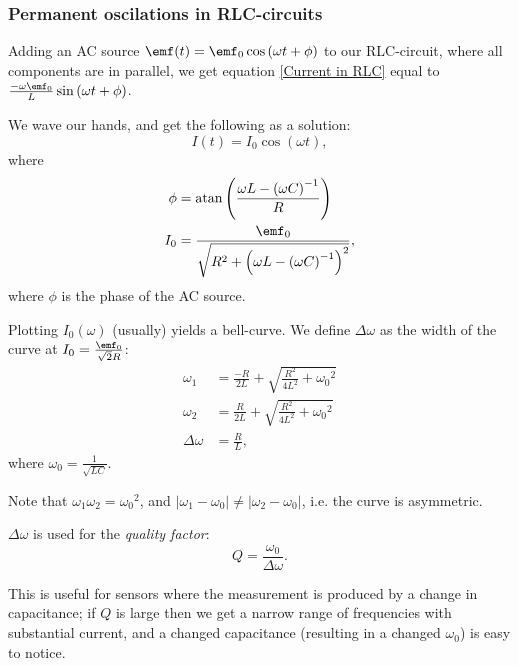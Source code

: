     \subsubsection{Permanent oscilations in RLC-circuits}

        Adding an AC source $\emf(t) = \emf_0\cos\left(\omega t + \phi\right)$ to our RLC-circuit, where all components are in parallel, 
        we get equation \ref{Current in RLC} equal to $\frac{-\omega\emf_0}{L}\sin\left(\omega t + \phi\right)$.
        
        We wave our hands, and get the following as a solution: 
        \begin{equation}
            I(t) = I_0 \cos\left(\omega t\right),
        \end{equation}
        where 
        \begin{align*}
            \phi &= \text{atan} \left(\frac{\omega L - \left(\omega C\right)^{-1}}{R}\right)\\
            I_0 &= \frac{\emf_0}{\sqrt{R^2 + \left(\omega L - \left(\omega C\right)^{-1}\right)^2}},
        \end{align*}
        where $\phi$ is the phase of the AC source.

        Plotting $I_0(\omega)$ (usually) yields a bell-curve. We define $\Delta\omega$ as the width of the curve at $I_0 = \frac{\emf_0}{\sqrt{2}R}$: 
        \begin{align*}
            \omega_1 &= \frac{-R}{2L} + \sqrt{\frac{R^2}{4L^2} + {\omega_0}^2}\\
            \omega_2 &= \frac{R}{2L} + \sqrt{\frac{R^2}{4L^2} + {\omega_0}^2}\\
            \Delta\omega &= \frac{R}{L},
        \end{align*}
        where $\omega_0 = \frac{1}{\sqrt{LC}}$.

        Note that $\omega_1\omega_2={\omega_0}^2$, and $|\omega_1 - \omega_0| \neq |\omega_2 - \omega_0|$, i.e. the curve is asymmetric.

        $\Delta\omega$ is used for the \textit{quality factor}:
        \begin{equation}
            Q = \frac{\omega_0}{\Delta\omega}.
        \end{equation}

        This is useful for sensors where the measurement is produced by a change in capacitance; 
        if $Q$ is large then we get a narrow range of frequencies with substantial current, and a changed capacitance 
        (resulting in a changed $\omega_0$) is easy to notice. 

